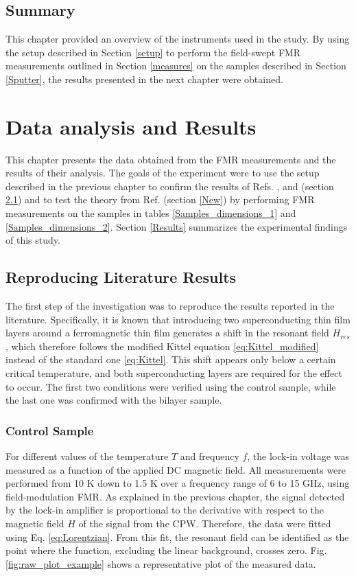 \documentclass[12pt,a4paper,oneside,openany]{book}
\begin{document}
\section{Summary}
This chapter provided an overview of the instruments used in the study. By using the setup described in Section \ref{setup} to perform the field-swept FMR measurements outlined in Section \ref{measures} on the samples described in Section \ref{Sputter}, the results presented in the next chapter were obtained.

\chapter{Data analysis and Results}
This chapter presents the data obtained from the FMR measurements and the results of their analysis. The goals of the experiment were to use the setup described in the previous chapter to confirm the results of Refs. \cite{Magnetization}, \cite{First_Evidence_1} and \cite{First_Evidence_2} (section \ref{Literature}) and to test the theory from Ref. \cite{Russian} (section \ref{New}) by performing FMR measurements on the samples in tables \ref{Samples_dimensions_1} and \ref{Samples_dimensions_2}. Section \ref{Results} summarizes the experimental findings of this study.

\section{Reproducing Literature Results}\label{Literature}
The first step of the investigation was to reproduce the results reported in the literature. Specifically, it is known that introducing two superconducting thin film layers around a ferromagnetic thin film generates a shift in the resonant field $H_{res}$, which therefore follows the modified Kittel equation \eqref{eq:Kittel_modified} instead of the standard one \eqref{eq:Kittel}. This shift appears only below a certain critical temperature, and both superconducting layers are required for the effect to occur. The first two conditions were verified using the control sample, while the last one was confirmed with the bilayer sample.

\subsection{Control Sample}
For different values of the temperature $T$ and frequency $f$, the lock-in voltage was measured as a function of the applied DC magnetic field. All measurements were performed from 10 K down to 1.5 K over a frequency range of 6 to 15 GHz, using field-modulation FMR. As explained in the previous chapter, the signal detected by the lock-in amplifier is proportional to the derivative with respect to the magnetic field $H$ of the signal from the CPW. Therefore, the data were fitted using Eq. \eqref{eq:Lorentzian}. From this fit, the resonant field can be identified as the point where the function, excluding the linear background, crosses zero. Fig. \ref{fig:raw_plot_example} shows a representative plot of the measured data.
\end{document}
